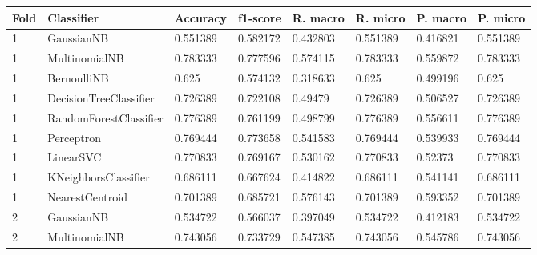 \documentclass{article}
\begin{document}
\begin{table}[h]
\begin{tabular}{llllllll}
\textbf{Fold} & \textbf{Classifier}    & \textbf{Accuracy} & \textbf{f1-score} & \textbf{R. macro} & \textbf{R. micro} & \textbf{P. macro} & \textbf{P. micro} \\ \hline
1             & GaussianNB             & 0.551389          & 0.582172          & 0.432803              & 0.551389              & 0.416821                 & 0.551389                 \\
1             & MultinomialNB          & 0.783333          & 0.777596          & 0.574115              & 0.783333              & 0.559872                 & 0.783333                 \\
1             & BernoulliNB            & 0.625             & 0.574132          & 0.318633              & 0.625                 & 0.499196                 & 0.625                    \\
1             & DecisionTreeClassifier & 0.726389          & 0.722108          & 0.49479               & 0.726389              & 0.506527                 & 0.726389                 \\
1             & RandomForestClassifier & 0.776389          & 0.761199          & 0.498799              & 0.776389              & 0.556611                 & 0.776389                 \\
1             & Perceptron             & 0.769444          & 0.773658          & 0.541583              & 0.769444              & 0.539933                 & 0.769444                 \\
1             & LinearSVC              & 0.770833          & 0.769167          & 0.530162              & 0.770833              & 0.52373                  & 0.770833                 \\
1             & KNeighborsClassifier   & 0.686111          & 0.667624          & 0.414822              & 0.686111              & 0.541141                 & 0.686111                 \\
1             & NearestCentroid        & 0.701389          & 0.685721          & 0.576143              & 0.701389              & 0.593352                 & 0.701389                 \\
2             & GaussianNB             & 0.534722          & 0.566037          & 0.397049              & 0.534722              & 0.412183                 & 0.534722                 \\
2             & MultinomialNB          & 0.743056          & 0.733729          & 0.547385              & 0.743056              & 0.545786                 & 0.743056                 \\

\end{tabular}
\end{table}
\end{document}
